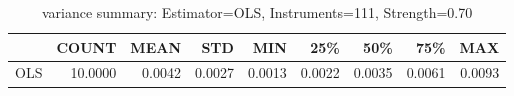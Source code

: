 \begin{table}[ht]
\centering
\caption{variance summary: Estimator=OLS, Instruments=111, Strength=0.70}
\begin{tabular}{lrrrrrrrr}
\toprule
 & COUNT & MEAN & STD & MIN & 25\% & 50\% & 75\% & MAX \\
\midrule
OLS & 10.0000 & 0.0042 & 0.0027 & 0.0013 & 0.0022 & 0.0035 & 0.0061 & 0.0093 \\
\bottomrule
\end{tabular}
\end{table}

